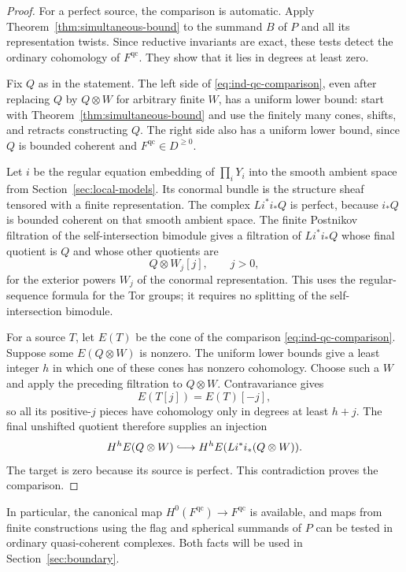 \documentclass[11pt]{article}
\numberwithin{equation}{section}
\theoremstyle{definition}
\theoremstyle{remark}
\begin{document}
\begin{proof}
For a perfect source, the comparison is automatic.  Apply
Theorem~\ref{thm:simultaneous-bound} to the summand $B$ of $P$ and
all its representation twists.  Since reductive invariants are
exact, these tests detect the ordinary cohomology of
$F^{\mathrm{qc}}$.  They show that it lies in degrees at least
zero.

Fix $Q$ as in the statement.  The left side of
\eqref{eq:ind-qc-comparison}, even after replacing $Q$ by
$Q\otimes W$ for arbitrary finite $W$, has a uniform lower bound:
start with Theorem~\ref{thm:simultaneous-bound} and use the finitely
many cones, shifts, and retracts constructing $Q$.  The right side
also has a uniform lower bound, since $Q$ is bounded coherent and
$F^{\mathrm{qc}}\in D^{\geq0}$.

Let $i$ be the regular equation embedding of $\prod_iY_i$ into the
smooth ambient space from Section~\ref{sec:local-models}.  Its
conormal bundle is the structure sheaf tensored with a finite
representation.  The complex $Li^*i_*Q$ is perfect, because $i_*Q$
is bounded coherent on that smooth ambient space.  The finite
Postnikov filtration of the self-intersection bimodule gives a
filtration of $Li^*i_*Q$ whose final quotient is $Q$ and whose other
quotients are
\[
 Q\otimes W_j[j],\qquad j>0,
\]
for the exterior powers $W_j$ of the conormal representation.  This
uses the regular-sequence formula for the Tor groups; it requires
no splitting of the self-intersection bimodule.

For a source $T$, let $E(T)$ be the cone of the comparison
\eqref{eq:ind-qc-comparison}.  Suppose some $E(Q\otimes W)$ is
nonzero.  The uniform lower bounds give a least integer $h$ in
which one of these cones has nonzero cohomology.  Choose such a
$W$ and apply the preceding filtration to $Q\otimes W$.
Contravariance gives
\[
 E(T[j])=E(T)[-j],
\]
so all its positive-$j$ pieces have cohomology only in degrees
at least $h+j$.  The final unshifted quotient therefore supplies
an injection
\[
 H^h E(Q\otimes W)
 \lhook\joinrel\longrightarrow H^hE(Li^*i_*(Q\otimes W)).
\]
The target is zero because its source is perfect.  This
contradiction proves the comparison.
\end{proof}

In particular, the canonical map
$H^0(F^{\mathrm{qc}})\to F^{\mathrm{qc}}$ is available, and maps
from finite constructions using the flag and spherical summands of
$P$ can be tested in ordinary quasi-coherent complexes.  Both facts
will be used in Section~\ref{sec:boundary}.
\end{document}
